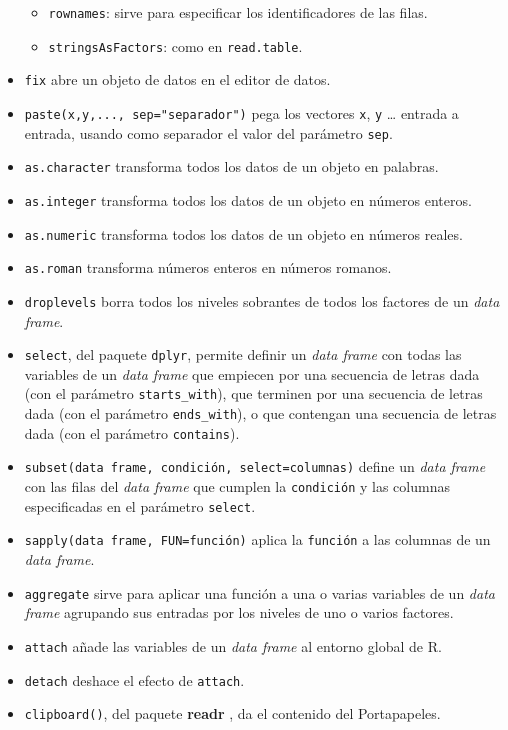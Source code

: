 \documentclass[
]{book}
\providecommand{\tightlist}{%
  \setlength{\itemsep}{0pt}\setlength{\parskip}{0pt}}
\theoremstyle{definition}
\theoremstyle{definition}
\theoremstyle{definition}
\theoremstyle{remark}
\begin{document}
\begin{itemize}
  \begin{itemize}
  \tightlist
  \item
    \texttt{rownames}: sirve para especificar los identificadores de las filas.
  \item
    \texttt{stringsAsFactors}: como en \texttt{read.table}.
  \end{itemize}
\item
  \texttt{fix} abre un objeto de datos en el editor de datos.
\item
  \texttt{paste(x,y,...,\ sep="separador")} pega los vectores \texttt{x}, \texttt{y} \ldots{} entrada a entrada, usando como separador el valor del parámetro \texttt{sep}.
\item
  \texttt{as.character} transforma todos los datos de un objeto en palabras.
\item
  \texttt{as.integer} transforma todos los datos de un objeto en números enteros.
\item
  \texttt{as.numeric} transforma todos los datos de un objeto en números reales.
\item
  \texttt{as.roman} transforma números enteros en números romanos.
\item
  \texttt{droplevels} borra todos los niveles sobrantes de todos los factores de un \emph{data frame}.
\item
  \texttt{select}, del paquete \texttt{dplyr}, permite definir un \emph{data frame} con todas las variables de un \emph{data frame} que empiecen por una secuencia de letras dada (con el parámetro \texttt{starts\_with}), que terminen por una secuencia de letras dada (con el parámetro \texttt{ends\_with}), o que contengan una secuencia de letras dada (con el parámetro \texttt{contains}).
\item
  \texttt{subset(data\ frame,\ condición,\ select=columnas)} define un \emph{data frame} con las filas del \emph{data frame} que cumplen la \texttt{condición} y las columnas especificadas en el parámetro \texttt{select}.
\item
  \texttt{sapply(data\ frame,\ FUN=función)} aplica la \texttt{función} a las columnas de un \emph{data frame}.
\item
  \texttt{aggregate} sirve para aplicar una función a una o varias variables de un \emph{data frame} agrupando sus entradas por los niveles de uno o varios factores.
\item
  \texttt{attach} añade las variables de un \emph{data frame} al entorno global de R.
\item
  \texttt{detach} deshace el efecto de \texttt{attach}.
\item
  \texttt{clipboard()}, del paquete \textbf{readr} , da el contenido del Portapapeles.
\end{itemize}
\end{document}

